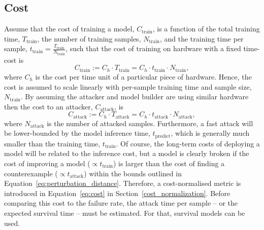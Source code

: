 \subsection{Cost}
\label{cost}

Assume that the cost of training a model, $C_{\mathrm{train}}$, is a function of the total training time, $T_{\mathrm{train}}$, the number of training samples, $N_{\mathrm{train}}$, and the training time per sample, $t_{\mathrm{train}} = \frac{T_{\mathrm{train}}}{N_{\mathrm{train}}}$, such that the cost of training on hardware with a fixed time-cost is
\begin{equation}
    C_{\mathrm{train}} := C_{h} \cdot T_{\mathrm{train}} = C_h \cdot t_{\mathrm{train}} \cdot N_{\mathrm{train}},
    \label{eq:naive_cost}
\end{equation}
where $C_h$ is the cost per time unit of a particular piece of hardware. Hence, the cost is assumed to scale linearly with per-sample training time and sample size, $N_{\mathrm{train}}$. By assuming the attacker and model builder are using similar hardware then the cost to an attacker, $C_{\mathrm{attack}}$, is
$$
    C_{\mathrm{attack}} := C_{h} \cdot T_{\mathrm{attack}} = C_h \cdot t_{\mathrm{attack}} \cdot N_{\mathrm{attack}},
$$
where $N_{\mathrm{attack}}$ is the number of attacked samples. Furthermore, a fast attack will be lower-bounded by the model inference time, $t_{\mathrm{predict}}$, which is generally much smaller than the training time, $t_{\mathrm{train}}$. Of course, the long-term costs of deploying a model will be related to the inference cost, but a model is clearly broken if the cost of improving a model ($\propto t_{\mathrm{train}}$) is larger than the cost of finding a counterexample ($\propto t_{\mathrm{attack}}$) within the bounds outlined in Equation~\ref{eq:perturbation_distance}. 
Therefore, a cost-normalised metric is introduced in Equation~\ref{eq:cost} in Section~\ref{cost_normalization}. Before comparing this cost to the failure rate, the attack time per sample -- or the expected survival time --  must be estimated. For that, survival models can be used.
